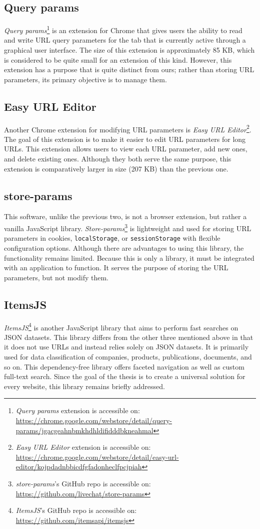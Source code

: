 \subsection*{Query params}
\emph{Query params}\footnote{\emph{Query params} extension is accessible on: \url{https://chrome.google.com/webstore/detail/query-params/jgacgeahnbmkhdhldifidddbkneahmal}} is an extension for Chrome that gives users the ability to read and write URL query parameters for the tab that is currently active through a graphical user interface. The size of this extension is approximately 85 KB, which is considered to be quite small for an extension of this kind. However, this extension has a purpose that is quite distinct from ours; rather than storing URL parameters, its primary objective is to manage them.

\subsection*{Easy URL Editor}
Another Chrome extension for modifying URL parameters is \emph{Easy URL Editor}\footnote{\emph{Easy URL Editor} extension is accessible on: \url{https://chrome.google.com/webstore/detail/easy-url-editor/kojpdadnbbicdfgfadonheclfpcjpiah}}. The goal of this extension is to make it easier to edit URL parameters for long URLs. This extension allows users to view each URL parameter, add new ones, and delete existing ones. Although they both serve the same purpose, this extension is comparatively larger in size (207 KB) than the previous one.

\subsection*{store-params}
This software, unlike the previous two, is not a browser extension, but rather a vanilla JavaScript library. \emph{Store-params}\footnote{\emph{store-params}'s GitHub repo is accessible on: \url{https://github.com/livechat/store-params}} is lightweight and used for storing URL parameters in cookies, \texttt{localStorage}, or \texttt{sessionStorage} with flexible configuration options. Although there are advantages to using this library, the functionality remains limited. Because this is only a library, it must be integrated with an application to function. It serves the purpose of storing the URL parameters, but not modify them.

\subsection*{ItemsJS}
\emph{ItemsJS}\footnote{\emph{ItemsJS}'s GitHub repo is accessible on: \url{https://github.com/itemsapi/itemsjs}} is another JavaScript library that aims to perform fast searches on JSON datasets. This library differs from the other three mentioned above in that it does not use URLs and instead relies solely on JSON datasets. It is primarily used for data classification of companies, products, publications, documents, and so on. This dependency-free library offers faceted navigation as well as custom full-text search. Since the goal of the thesis is to create a universal solution for every website, this library remains briefly addressed.


